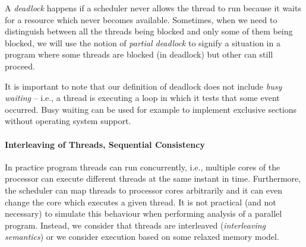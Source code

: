 \begin{definition}\label{def:deadlock}
    A \emph{deadlock} happens if a scheduler never allows the thread to run
    because it waits for a resource which never becomes available.
    Sometimes, when we need to distinguish between all the threads being
    blocked and only some of them being blocked, we will use the notion of
    \emph{partial deadlock} to signify a situation in a program where some
    threads are blocked (in deadlock) but other can still proceed.
\end{definition}

It is important to note that our definition of deadlock does not include
\emph{busy waiting} -- i.e., a thread is executing a loop in which it tests
that some event occurred.
Busy waiting can be used for example to implement exclusive sections without
operating system support.

\begin{definition}[Livelock]\label{def:livelock}
\end{definition}

\paragraph{Interleaving of Threads, Sequential Consistency}

In practice program threads can run concurrently, i.e., multiple cores of the
processor can execute different threads at the same instant in time.
Furthermore, the scheduler can map threads to processor cores arbitrarily and
it can even change the core which executes a given thread.
It is not practical (and not necessary) to simulate this behaviour when
performing analysis of a parallel program.
Instead, we consider that threads are interleaved (\emph{interleaving
semantics}) or we consider execution based on some relaxed memory model.

\begin{definition}
\end{definition}

